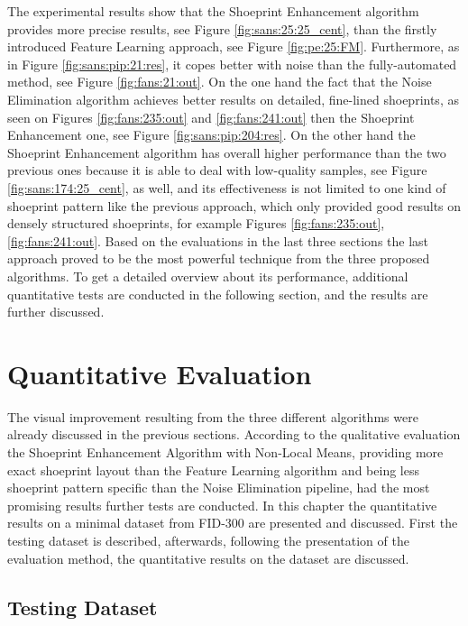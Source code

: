 \documentclass[draft,final]{vutinfth} %
\begin{document}
\par
The experimental results show that the Shoeprint Enhancement algorithm provides more precise results, see Figure \ref{fig:sans:25:25_cent}, than the firstly introduced Feature Learning approach, see Figure \ref{fig:pe:25:FM}.
Furthermore, as in Figure \ref{fig:sans:pip:21:res}, it copes better with noise than the fully-automated method, see Figure \ref{fig:fans:21:out}.
On the one hand the fact that the Noise Elimination algorithm achieves better results on detailed, fine-lined shoeprints, as seen on Figures \ref{fig:fans:235:out} and \ref{fig:fans:241:out} then the Shoeprint Enhancement one, see Figure \ref{fig:sans:pip:204:res}.
On the other hand the Shoeprint Enhancement algorithm has overall higher performance than the two previous ones because it is able to deal with low-quality samples, see Figure \ref{fig:sans:174:25_cent}, as well, and its effectiveness is not limited to one kind of shoeprint pattern like the previous approach, which only provided good results on densely structured shoeprints, for example Figures \ref{fig:fans:235:out}, \ref{fig:fans:241:out}. 
Based on the evaluations in the last three sections the last approach proved to be the most powerful technique from the three proposed algorithms.
To get a detailed overview about its performance, additional quantitative tests are conducted in the following section, and the results are further discussed.

\section{Quantitative Evaluation}
\par
The visual improvement resulting from the three different algorithms were already discussed in the previous sections.
According to the qualitative evaluation the Shoeprint Enhancement Algorithm with Non-Local Means, providing more exact shoeprint layout than the Feature Learning algorithm and being less shoeprint pattern specific than the Noise Elimination pipeline, had the most promising results further tests are conducted.
In this chapter the quantitative results on a minimal dataset from FID-300 are presented and discussed.
First the testing dataset is described, afterwards, following the presentation of the evaluation method, the quantitative results on the dataset are discussed.

\subsection{Testing Dataset}
\end{document}
